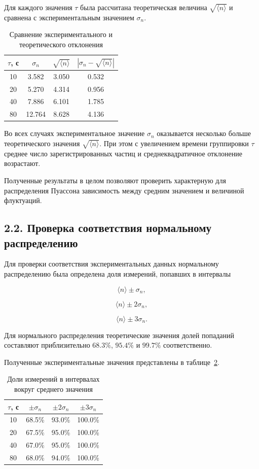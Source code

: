 \documentclass[12pt,a4paper]{article}
\begin{document}
Для каждого значения $\tau$ была рассчитана теоретическая величина $\sqrt{\langle n\rangle}$ и сравнена с экспериментальным значением $\sigma_n$.

\begin{table}[H]
\centering
\caption{Сравнение экспериментального и теоретического отклонения}
\label{tab:poisson}
\begin{tabular}{c|c|c|c}
\toprule
$\tau$, с & $\sigma_n$ & $\sqrt{\langle n\rangle}$ &
$|\sigma_n-\sqrt{\langle n\rangle}|$ \\
\midrule
10 & 3.582 & 3.050 & 0.532 \\
20 & 5.270 & 4.314 & 0.956 \\
40 & 7.886 & 6.101 & 1.785 \\
80 & 12.764 & 8.628 & 4.136 \\
\bottomrule
\end{tabular}
\end{table}

Во всех случаях экспериментальное значение $\sigma_n$ оказывается несколько больше теоретического значения $\sqrt{\langle n\rangle}$. При этом с увеличением времени группировки $\tau$ среднее число зарегистрированных частиц и среднеквадратичное отклонение возрастают.

Полученные результаты в целом позволяют проверить характерную для распределения Пуассона зависимость между средним значением и величиной флуктуаций.

\subsection*{2.2. Проверка соответствия нормальному распределению}

Для проверки соответствия экспериментальных данных нормальному распределению была определена доля измерений, попавших в интервалы

\[
\langle n\rangle\pm\sigma_n,
\]

\[
\langle n\rangle\pm2\sigma_n,
\]

\[
\langle n\rangle\pm3\sigma_n.
\]

Для нормального распределения теоретические значения долей попаданий составляют приблизительно $68.3\%$, $95.4\%$ и $99.7\%$ соответственно.

Полученные экспериментальные значения представлены в таблице~\ref{tab:fractions}.

\begin{table}[H]
\centering
\caption{Доли измерений в интервалах вокруг среднего значения}
\label{tab:fractions}
\begin{tabular}{c|c|c|c}
\toprule
$\tau$, с & $\pm\sigma_n$ & $\pm2\sigma_n$ & $\pm3\sigma_n$ \\
\midrule
10 & 68.5\% & 93.0\% & 100.0\% \\
20 & 67.5\% & 95.0\% & 100.0\% \\
40 & 67.0\% & 95.0\% & 100.0\% \\
80 & 68.0\% & 94.0\% & 100.0\% \\
\bottomrule
\end{tabular}
\end{table}
\end{document}
